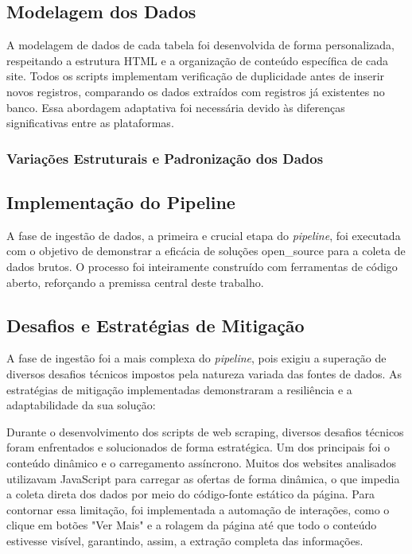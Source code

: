 \subsection{Modelagem dos Dados}

A modelagem de dados de cada tabela foi desenvolvida de forma personalizada, respeitando a estrutura HTML e a organização de conteúdo específica de cada site. Todos os scripts implementam verificação de duplicidade antes de inserir novos registros, comparando os dados extraídos com registros já existentes no banco. Essa abordagem adaptativa foi necessária devido às diferenças significativas entre as plataformas.

\subsubsection{Variações Estruturais e Padronização dos Dados}




\subsection{Implementação do Pipeline}

A fase de ingestão de dados, a primeira e crucial etapa do \textit{pipeline}, foi executada com o objetivo de demonstrar a eficácia de soluções \acs{open_source} para a coleta de dados brutos. O processo foi inteiramente construído com ferramentas de código aberto, reforçando a premissa central deste trabalho.

\subsection{Desafios e Estratégias de Mitigação}

A fase de ingestão foi a mais complexa do \textit{pipeline}, pois exigiu a superação de diversos desafios técnicos impostos pela natureza variada das fontes de dados. As estratégias de mitigação implementadas demonstraram a resiliência e a adaptabilidade da sua solução:

Durante o desenvolvimento dos scripts de web scraping, diversos desafios técnicos foram enfrentados e solucionados de forma estratégica. Um dos principais foi o conteúdo dinâmico e o carregamento assíncrono. Muitos dos websites analisados utilizavam JavaScript para carregar as ofertas de forma dinâmica, o que impedia a coleta direta dos dados por meio do código-fonte estático da página. Para contornar essa limitação, foi implementada a automação de interações, como o clique em botões "Ver Mais" e a rolagem da página até que todo o conteúdo estivesse visível, garantindo, assim, a extração completa das informações.

